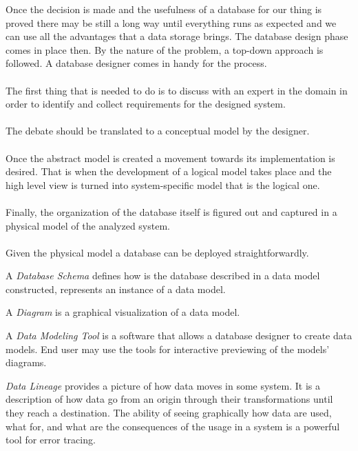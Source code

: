\par
Once the decision is made and the usefulness of a database for our thing is proved there may be still a long way until everything runs as expected and we can use all the advantages that a data storage brings.
The database design phase comes in place then. By the nature of the problem, a top-down approach is followed.
A database designer comes in handy for the process. \\ \\
The first thing that is needed to do is to discuss with an expert in the domain  in order to identify and collect requirements for the designed system. \\ \\
The debate should be translated to a conceptual model by the designer.  \\ \\
Once the abstract model is created a movement towards its implementation is desired. That is when the development of a logical model takes place and the high level view is turned into system-specific model that is the logical one. \\ \\
Finally, the organization of the database itself is figured out and captured in a physical model of the analyzed system. \\ \\
Given the physical model a database can be deployed straightforwardly. \\

\par 
A \textit{Database Schema} defines how is the database described in a data model constructed, represents an instance of a data model. \\
\par 
A \textit{Diagram} is a graphical visualization of a data model. \\
\par
A \textit{Data Modeling Tool} is a software that allows a database designer to create data models. End user may use the tools for interactive previewing of the models' diagrams. \\

\par
\textit{Data Lineage} provides a picture of how data moves in some system. It is a description of how data go from an origin through their transformations until they reach a destination. 
The ability of seeing graphically how data are used, what for, and what are the consequences of the usage in a system is a powerful tool for error tracing. \\

